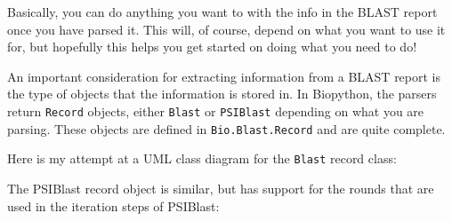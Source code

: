 Basically, you can do anything you want to with the info in the BLAST
report once you have parsed it. This will, of course, depend on what
you want to use it for, but hopefully this helps you get started on
doing what you need to do!

An important consideration for extracting information from a BLAST report is the type of objects that the information is stored in. In Biopython, the parsers return \verb|Record| objects, either \verb|Blast| or \verb|PSIBlast| depending on what you are parsing. These objects are defined in \verb|Bio.Blast.Record| and are quite complete.

\begin{htmlonly}
Here is my attempt at a UML class diagram for the \verb|Blast| record class:


The PSIBlast record object is similar, but has support for the rounds that are used in the iteration steps of PSIBlast:

\end{htmlonly}

